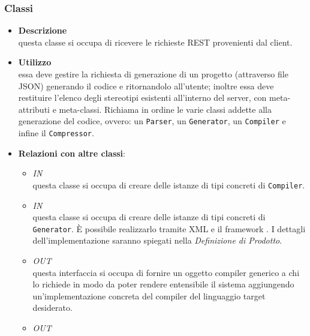 \subsubsection{Classi}
\label{\nogloxy{swedesigner::server::controller::RequestHandlerController}}
\begin{itemize}
\item \textbf{Descrizione}\\
questa classe si occupa di ricevere le richieste REST provenienti dal client.
\item \textbf{Utilizzo}\\
essa deve gestire la richiesta di generazione di un progetto (attraverso file JSON) generando il codice e ritornandolo all'utente; inoltre essa deve restituire l'elenco degli stereotipi esistenti all'interno del server, con meta-attributi e meta-classi.
Richiama in ordine le varie classi addette alla generazione del codice, ovvero: un \texttt{Parser}, un \texttt{Generator}, un \texttt{Compiler} e infine il \texttt{Compressor}. 
\item \textbf{Relazioni con altre classi}:
\begin{itemize}
\item \textit{IN} \hyperref[\nogloxy{swedesigner::server::compiler::CompilerAssembler}]{}\\
questa classe si occupa di creare delle istanze di tipi concreti di \texttt{Compiler}. 
\item \textit{IN} \hyperref[\nogloxy{swedesigner::server::generator::GeneratorAssembler}]{}\\
questa classe si occupa di creare delle istanze di tipi concreti di \texttt{Generator}. È possibile realizzarlo tramite XML e il framework \spring. I dettagli dell'implementazione saranno spiegati nella \emph{Definizione di Prodotto}. %
\item \textit{OUT} \hyperref[\nogloxy{swedesigner::server::compiler::Compiler}]{}\\
questa interfaccia si occupa di fornire un oggetto compiler generico a chi lo richiede in modo da poter rendere entensibile il sistema aggiungendo un'implementazione concreta del compiler del linguaggio target desiderato.
\item \textit{OUT} \hyperref[\nogloxy{swedesigner::server::generator::Generator}]{}\\

\end{itemize}
\end{itemize}
